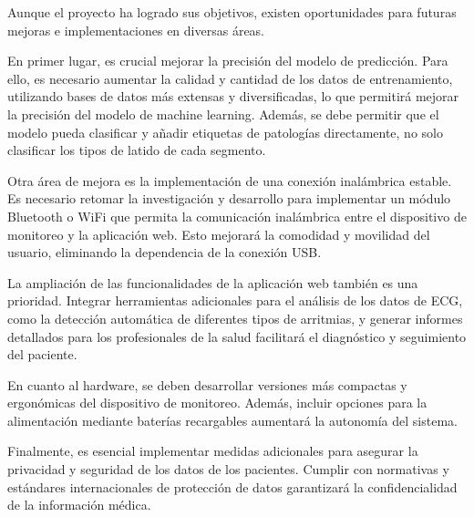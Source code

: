 
Aunque el proyecto ha logrado sus objetivos, existen oportunidades para futuras mejoras e implementaciones en diversas áreas.

En primer lugar, es crucial mejorar la precisión del modelo de predicción. Para ello, es necesario aumentar la calidad y cantidad de los datos de entrenamiento, utilizando bases de datos más extensas y diversificadas, lo que permitirá mejorar la precisión del modelo de machine learning. Además, se debe permitir que el modelo pueda clasificar y añadir etiquetas de patologías directamente, no solo clasificar los tipos de latido de cada segmento.

Otra área de mejora es la implementación de una conexión inalámbrica estable. Es necesario retomar la investigación y desarrollo para implementar un módulo Bluetooth o WiFi que permita la comunicación inalámbrica entre el dispositivo de monitoreo y la aplicación web. Esto mejorará la comodidad y movilidad del usuario, eliminando la dependencia de la conexión USB.

La ampliación de las funcionalidades de la aplicación web también es una prioridad. Integrar herramientas adicionales para el análisis de los datos de ECG, como la detección automática de diferentes tipos de arritmias, y generar informes detallados para los profesionales de la salud facilitará el diagnóstico y seguimiento del paciente.

En cuanto al hardware, se deben desarrollar versiones más compactas y ergonómicas del dispositivo de monitoreo. Además, incluir opciones para la alimentación mediante baterías recargables aumentará la autonomía del sistema.

Finalmente, es esencial implementar medidas adicionales para asegurar la privacidad y seguridad de los datos de los pacientes. Cumplir con normativas y estándares internacionales de protección de datos garantizará la confidencialidad de la información médica.



